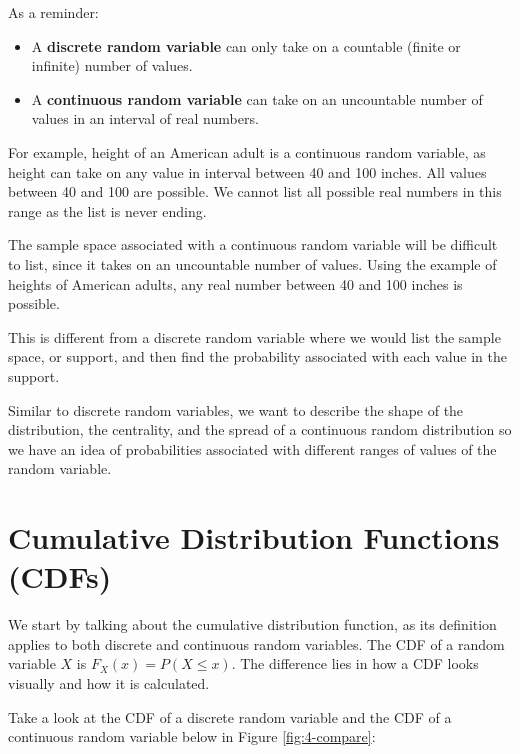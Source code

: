 \documentclass[
]{book}
\providecommand{\tightlist}{%
  \setlength{\itemsep}{0pt}\setlength{\parskip}{0pt}}
\begin{document}
As a reminder:

\begin{itemize}
\tightlist
\item
  A \textbf{discrete random variable} can only take on a countable (finite or infinite) number of values.
\item
  A \textbf{continuous random variable} can take on an uncountable number of values in an interval of real numbers.
\end{itemize}

For example, height of an American adult is a continuous random variable, as height can take on any value in interval between 40 and 100 inches. All values between 40 and 100 are possible. We cannot list all possible real numbers in this range as the list is never ending.

The sample space associated with a continuous random variable will be difficult to list, since it takes on an uncountable number of values. Using the example of heights of American adults, any real number between 40 and 100 inches is possible.

This is different from a discrete random variable where we would list the sample space, or support, and then find the probability associated with each value in the support.

Similar to discrete random variables, we want to describe the shape of the distribution, the centrality, and the spread of a continuous random distribution so we have an idea of probabilities associated with different ranges of values of the random variable.

\section{Cumulative Distribution Functions (CDFs)}\label{cumulative-distribution-functions-cdfs-1}

We start by talking about the cumulative distribution function, as its definition applies to both discrete and continuous random variables. The CDF of a random variable \(X\) is \(F_X(x) = P(X \leq x)\). The difference lies in how a CDF looks visually and how it is calculated.

Take a look at the CDF of a discrete random variable and the CDF of a continuous random variable below in Figure \ref{fig:4-compare}:
\end{document}
